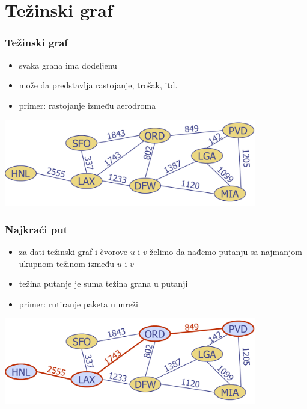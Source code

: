 \documentclass[compress]{beamer}
\begin{document}
\section[Težinski graf]{Težinski graf}

\begin{frame}[fragile]
  \frametitle{Težinski graf}
  \begin{itemize}
    \item svaka grana ima dodeljenu 
    \item može da predstavlja rastojanje, trošak, itd.
    \item primer: rastojanje između aerodroma
  \end{itemize}
  \begin{center}
    \includegraphics[width=11cm]{asp-14-pic58.png}
  \end{center}
\end{frame}

\begin{frame}[fragile]
  \frametitle{Najkraći put}
  \begin{itemize}
    \item za dati težinski graf i čvorove $u$ i $v$ želimo da nađemo
      putanju sa najmanjom ukupnom težinom između $u$ i $v$
    \item težina putanje je suma težina grana u putanji
    \item primer: rutiranje paketa u mreži
  \end{itemize}
  \begin{center}
    \includegraphics[width=11cm]{asp-14-pic59.png}
  \end{center}
\end{frame}
\end{document}
